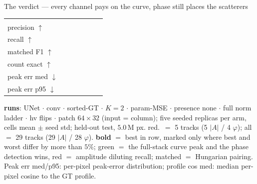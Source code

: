 \begin{frame}{The verdict --- every channel pays on the curve, phase still places the scatterers}
\begin{tabular}{@{}l cc cc !{\hspace{3pt}} cc@{}}
    \addlinespace
     \\
    precision $\uparrow$   &  &  &  &  &  &  \\
    recall $\uparrow$      &  &  &  &  &  &  \\
    matched F1 $\uparrow$  &  &  &  &  &  &  \\
    count exact $\uparrow$ &  &  &  &  &  &  \\
    peak err med $\downarrow$ &  &  &  &  &  &  \\
    peak err p95 $\downarrow$ &  &  &  &  &  &  \\
    \bottomrule
  \end{tabular}
  \par\vspace{3pt}
  \parbox{0.82\textwidth}{\tiny\color{soft} \textbf{runs}: UNet $\cdot$ conv $\cdot$ sorted-GT $\cdot$ $K{=}2$ $\cdot$ param-MSE $\cdot$ presence none $\cdot$ full norm ladder $\cdot$ hv flips $\cdot$ patch $64{\times}32$ (input = column); five seeded replicas per arm, cells mean $\pm$ seed std; held-out test, $5.0$\,M px. red.\ $=$ 5 tracks (5 $|A|$ / 4 $\varphi$); all $=$ 29 tracks (29 $|A|$ / 28 $\varphi$). \textbf{bold} $=$ best in row, marked only where best and worst differ by more than $5\%$; \textcolor{good}{green} $=$ the full-stack curve peak and the phase detection wins, \textcolor{accent}{red} $=$ amplitude diluting recall; matched $=$ Hungarian pairing. Peak err med/p95: per-pixel peak-error distribution; profile cos med: median per-pixel cosine to the GT profile.\par}
    

\end{frame}

